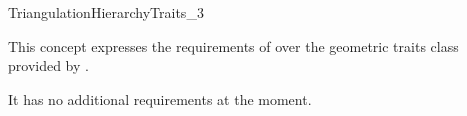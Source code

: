 
\begin{ccRefConcept}{TriangulationHierarchyTraits_3}

\ccDefinition

This concept expresses the requirements of 
over the geometric traits class  provided by .

\ccRefines {}

It has no additional requirements at the moment.

\end{ccRefConcept}
